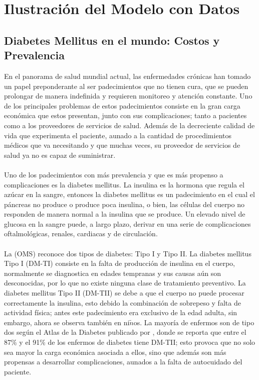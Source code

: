 \chapter{Ilustraci\'on del Modelo con Datos}
\section{Diabetes Mellitus en el mundo: Costos y Prevalencia}
En el panorama de salud mundial actual, las enfermedades cr\'onicas han tomado un papel preponderante al ser padecimientos que no tienen cura, que se pueden prolongar de manera indefinida y requieren monitoreo y atenci\'on constante. Uno de los principales problemas de estos padecimientos consiste en la gran carga econ\'omica que estos presentan, junto con sus complicaciones; tanto a pacientes como a los proveedores de servicios de salud. Adem\'as de la decreciente calidad de vida que experimenta el paciente, aunado a la cantidad de procedimientos m\'edicos que va necesitando y que muchas veces, su proveedor de servicios de salud ya no es capaz de suministrar.\\
\\
Uno de los padecimientos con m\'as prevalencia y que es m\'as propenso a complicaciones es la diabetes mellitus. La insulina es la hormona que regula el az\'ucar en la sangre, entonces la diabetes mellitus es un padecimiento en el cual el p\'ancreas no produce o produce poca insulina, o bien, las c\'elulas del cuerpo no responden de manera normal a la insulina que se produce. Un elevado nivel de glucosa en la sangre puede, a largo plazo, derivar en una serie de complicaciones oftalmol\'ogicas, renales, cardiacas y de circulaci\'on.\\
\\
La \cite{FactSheetDiabetes} %
 (OMS) reconoce dos tipos de diabetes: Tipo I y Tipo II. La diabetes mellitus Tipo I (DM-TI) consiste en la falta de producci\'on de insulina en el cuerpo, normalmente se diagnostica en edades tempranas y sus causas a\'un son desconocidas, por lo que no existe ninguna clase de tratamiento preventivo. La diabetes mellitus Tipo II (DM-TII) se debe a que el cuerpo no puede procesar correctamente la insulina, esto debido la combinaci\'on de sobrepeso y falta de actividad f\'isica; antes este padecimiento era exclusivo de la edad adulta, sin embargo, ahora se observa tambi\'en en ni$\tilde{n}$os. La mayor\'ia de enfermos son de tipo dos seg\'un el Atlas de la Diabetes publicado por \cite{atlas2015international}, donde se reporta que entre el 87\% y el 91\% de los enfermos de diabetes tiene DM-TII; esto provoca que no solo sea mayor la carga econ\'omica asociada a ellos, sino que adem\'as son m\'as propensas a desarrollar complicaciones, aunados a la falta de autocuidado del paciente.\\
